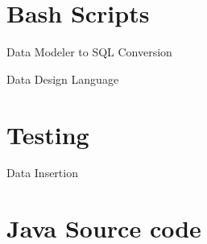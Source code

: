 \documentclass[a4paper,10pt,toc=graduated]{article}
\begin{document}
\begin{appendices}
\section{Bash Scripts}
\begin{mySubsection}{Data Modeler to SQL Conversion}

\end{mySubsection}
\begin{mySubsection}{Data Design Language}

\end{mySubsection}
\section{Testing}
\begin{mySubsection}{Data Insertion}

\end{mySubsection}
\section{Java Source code}

\end{appendices}
\end{document}
